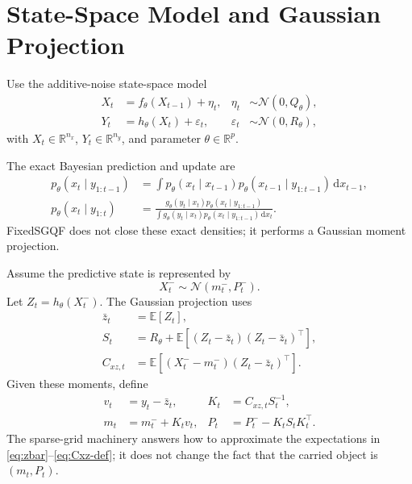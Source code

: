 \documentclass[11pt]{article}
\numberwithin{equation}{section}
\newcommand{\R}{\mathbb R}
\newcommand{\E}{\mathbb E}
\newcommand{\N}{\mathcal N}
\newcommand{\dd}{\,\mathrm d}
\begin{document}
\section{State-Space Model and Gaussian Projection}
\label{sec:ssm-gaussian-projection}

Use the additive-noise state-space model
\begin{align}
  X_t &= f_\theta(X_{t-1}) + \eta_t,
  &
  \eta_t &\sim \N(0,Q_\theta),
  \label{eq:state-model}\\
  Y_t &= h_\theta(X_t) + \varepsilon_t,
  &
  \varepsilon_t &\sim \N(0,R_\theta),
  \label{eq:observation-model}
\end{align}
with \(X_t\in\R^{n_x}\), \(Y_t\in\R^{n_y}\), and parameter
\(\theta\in\R^p\).

The exact Bayesian prediction and update are
\begin{align}
  p_\theta(x_t\mid y_{1:t-1})
  &=
  \int p_\theta(x_t\mid x_{t-1}) p_\theta(x_{t-1}\mid y_{1:t-1})\dd x_{t-1},
  \label{eq:exact-prediction}\\
  p_\theta(x_t\mid y_{1:t})
  &=
  \frac{g_\theta(y_t\mid x_t)p_\theta(x_t\mid y_{1:t-1})}
  {\int g_\theta(y_t\mid x_t)p_\theta(x_t\mid y_{1:t-1})\dd x_t}.
  \label{eq:exact-update}
\end{align}
FixedSGQF does not close these exact densities; it performs a Gaussian moment
projection.

Assume the predictive state is represented by
\begin{equation}
  X_t^-\sim\N(m_t^-,P_t^-).
  \label{eq:predictive-gaussian}
\end{equation}
Let \(Z_t=h_\theta(X_t^-)\).  The Gaussian projection uses
\begin{align}
  \bar z_t &= \E[Z_t],
  \label{eq:zbar}\\
  S_t &= R_\theta + \E[(Z_t-\bar z_t)(Z_t-\bar z_t)^\top],
  \label{eq:S-def}\\
  C_{xz,t} &= \E[(X_t^- - m_t^-)(Z_t-\bar z_t)^\top].
  \label{eq:Cxz-def}
\end{align}
Given these moments, define
\begin{align}
  v_t &= y_t-\bar z_t,
  &
  K_t &= C_{xz,t}S_t^{-1},
  \label{eq:innovation-and-gain}\\
  m_t &= m_t^- + K_t v_t,
  &
  P_t &= P_t^- - K_tS_tK_t^\top.
  \label{eq:gaussian-projection-update}
\end{align}
The sparse-grid machinery answers how to approximate the expectations in
\eqref{eq:zbar}--\eqref{eq:Cxz-def}; it does not change the fact that the
carried object is \((m_t,P_t)\).
\end{document}
